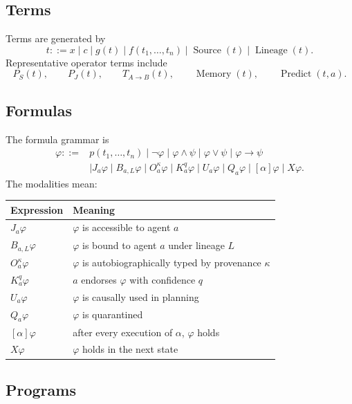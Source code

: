 \documentclass[11pt]{article}
\theoremstyle{definition}
\theoremstyle{remark}
\begin{document}
\subsection{Terms}

Terms are generated by
\[
t::=x\mid c\mid g(t)\mid f(t_1,\ldots,t_n)\mid\operatorname{Source}(t)\mid\operatorname{Lineage}(t).
\]
Representative operator terms include
\[
P_S(t),
\qquad
P_J(t),
\qquad
T_{A\to B}(t),
\qquad
\operatorname{Memory}(t),
\qquad
\operatorname{Predict}(t,a).
\]

\subsection{Formulas}

The formula grammar is
\[
\begin{aligned}
\varphi::={}&p(t_1,\ldots,t_n)
\mid\neg\varphi
\mid\varphi\wedge\psi
\mid\varphi\vee\psi
\mid\varphi\to\psi\\
&\mid J_a\varphi
\mid B_{a,L}\varphi
\mid O_a^\kappa\varphi
\mid K_a^q\varphi
\mid U_a\varphi
\mid Q_a\varphi
\mid[\alpha]\varphi
\mid X\varphi.
\end{aligned}
\]
The modalities mean:
\begin{center}
\begin{tabular}{ll}
\toprule
Expression & Meaning \\
\midrule
\(J_a\varphi\) & \(\varphi\) is accessible to agent \(a\) \\
\(B_{a,L}\varphi\) & \(\varphi\) is bound to agent \(a\) under lineage \(L\) \\
\(O_a^\kappa\varphi\) & \(\varphi\) is autobiographically typed by provenance \(\kappa\) \\
\(K_a^q\varphi\) & \(a\) endorses \(\varphi\) with confidence \(q\) \\
\(U_a\varphi\) & \(\varphi\) is causally used in planning \\
\(Q_a\varphi\) & \(\varphi\) is quarantined \\
\([\alpha]\varphi\) & after every execution of \(\alpha\), \(\varphi\) holds \\
\(X\varphi\) & \(\varphi\) holds in the next state \\
\bottomrule
\end{tabular}
\end{center}

\subsection{Programs}
\end{document}
